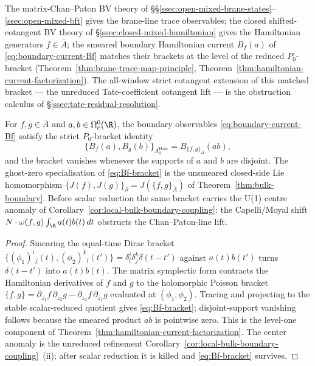 \documentclass[11pt]{memoir}
\begin{document}
The matrix-Chan--Paton BV theory of
\S\S\ref{ssec:open-mixed-brane-states}--\ref{ssec:open-mixed-bft}
gives the brane-line trace observables; the closed shifted-cotangent
BV theory of \S\ref{ssec:closed-mixed-hamiltonian} gives the
Hamiltonian generators \(f\in\bar A\); the smeared boundary Hamiltonian
current \(B_f(a)\) of
  \eqref{eq:boundary-current-Bf} matches their brackets at
the level of the reduced \(P_0\)-bracket
(Theorem~\ref{thm:brane-trace-map-principle},
Theorem~\ref{thm:hamiltonian-current-factorization}). The all-window
strict cotangent extension of this matched bracket --- the unreduced
Tate-coefficient cotangent lift --- is the obstruction calculus of
\S\ref{ssec:tate-residual-resolution}.

\begin{thm}\label{thm:brane-trace-map-principle}
  For $f,g\in\bar A$ and $a,b\in\Omega^0_c(\R)$, the boundary
  observables \eqref{eq:boundary-current-Bf} satisfy the strict
  $P_0$-bracket identity
  \begin{equation}\label{eq:Bf-bracket}
    \{B_f(a),B_g(b)\}_{A_\partial^{\mathrm{Ham}}}
      =B_{\{f,g\}_{\bar A}}(ab),
  \end{equation}
  and the bracket vanishes whenever the supports of $a$ and $b$ are
  disjoint.  The ghost-zero specialisation of \eqref{eq:Bf-bracket} is
  the unsmeared closed-side Lie homomorphism
  \(\{J(f),J(g)\}_\partial=J(\{f,g\}_{\bar A})\) of
  Theorem~\ref{thm:bulk-boundary}.  Before scalar reduction the same
  bracket carries the U(1) centre anomaly of
  Corollary~\ref{cor:local-bulk-boundary-coupling}: the Capelli/Moyal
  shift $N\cdot\omega(f,g)\int_\R a(t)b(t)\,dt$ obstructs the
  Chan--Paton-line lift.
\end{thm}

\begin{proof}
  Smearing the equal-time Dirac bracket
  \(\{(\phi_1)^i{}_j(t),(\phi_2)^k{}_l(t')\}=\delta^i_l\delta^k_j\delta(t-t')\)
  against $a(t)b(t')$ turns $\delta(t-t')$ into $a(t)b(t)$.  The matrix
  symplectic form contracts the Hamiltonian derivatives of $f$ and $g$
  to the holomorphic Poisson bracket
  $\{f,g\}=\partial_{z_1}f\,\partial_{z_2}g-\partial_{z_2}f\,\partial_{z_1}g$
  evaluated at $(\phi_1,\phi_2)$.  Tracing and projecting to the stable
  scalar-reduced quotient gives \eqref{eq:Bf-bracket}; disjoint-support
  vanishing follows because the smeared product $ab$ is pointwise zero.
  This is the level-one component of
  Theorem~\ref{thm:hamiltonian-current-factorization}.  The center
  anomaly is the unreduced refinement
  Corollary~\ref{cor:local-bulk-boundary-coupling}~(ii); after scalar
  reduction it is killed and \eqref{eq:Bf-bracket} survives.
\end{proof}
\end{document}
